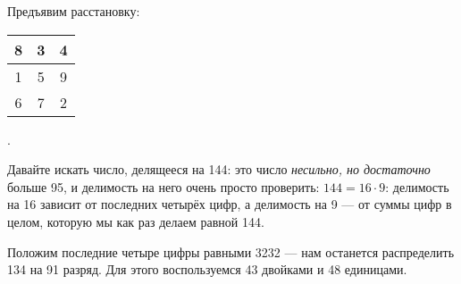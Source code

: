 \begin{itemize}
\itA Предъявим расстановку:

\begin{center}
\begin{tabular}{|c|c|c|}
\hline
	8 & 3 & 4 \\
\hline
	1 & 5 & 9 \\
\hline
	6 & 7 & 2 \\
\hline
\end{tabular}
\end{center}

.

\itC Давайте искать число, делящееся на 144: это число {\itshape несильно, но достаточно} больше 95, и делимость на него очень просто проверить: $144 = 16\cdot 9$: делимость на 16 зависит от последних четырёх цифр, а делимость на 9 — от суммы цифр в целом, которую мы как раз делаем равной 144.

Положим последние четыре цифры равными 3232 — нам останется распределить 134 на 91 разряд. Для этого воспользуемся 43 двойками и 48 единицами.
\end{itemize}
